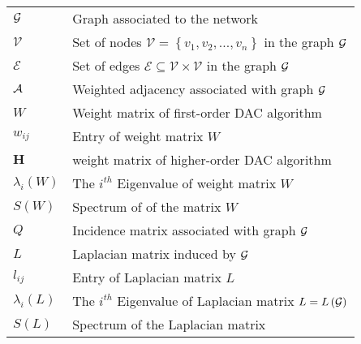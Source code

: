\begin{tabular}{p{2.5cm} p{11cm}} %





${\cal G}$  &  Graph associated to the network \\


$\mathcal{V}$  &  Set of nodes $\mathcal{V}=\left\{ v_{1},v_{2},...,v_{n}\right\} $
in the graph ${\cal G}$\\


$\mathcal{E}$  &  Set of edges $\mathcal{E}\subseteq\mathcal{V}\times\mathcal{V}$
in the graph ${\cal G}$\\


${\cal A}$  &  Weighted adjacency associated with graph ${\cal G}$\\


$W$  &  Weight matrix of first-order DAC algorithm \\


$w_{ij}$  &  Entry of weight matrix $W$\\


$\mathbf{H}$  &  weight matrix of higher-order DAC algorithm \\


$\lambda_{i}\left(W\right)$ &  The $i^{th}$ Eigenvalue of weight
matrix $W$\\


$S\left(W\right)$  &  Spectrum of of the matrix $W$\\


\textit{$Q$ } &  Incidence matrix associated with graph ${\cal G}$\\


$L$  &  Laplacian matrix induced by ${\cal G}$\\


$l_{ij}$  &  Entry of Laplacian matrix $L$\\


$\lambda_{i}\left(L\right)$ &  The $i^{th}$ Eigenvalue of Laplacian
matrix $L=L\left({\cal G}\right)$\\


$S\left(L\right)$  &  Spectrum of the Laplacian matrix\\



\end{tabular}
